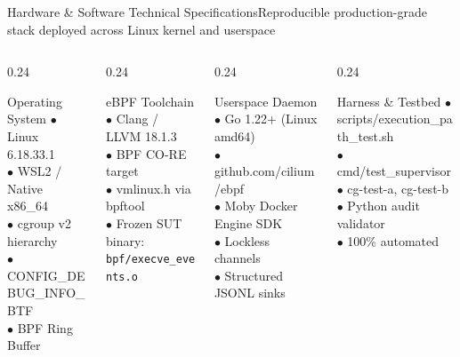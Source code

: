 \documentclass[aspectratio=169,10pt]{beamer}
\begin{document}
\begin{frame}{Hardware \& Software Technical Specifications}{Reproducible production-grade stack deployed across Linux kernel and userspace}
  \begin{columns}[T]
    \begin{column}{0.24\textwidth}
      \begin{block}{Operating System}
        \tiny
        $\bullet$ Linux 6.18.33.1\\
        $\bullet$ WSL2 / Native x86\_64\\
        $\bullet$ cgroup v2 hierarchy\\
        $\bullet$ CONFIG\_DEBUG\_INFO\_BTF\\
        $\bullet$ BPF Ring Buffer
      \end{block}
    \end{column}

    \begin{column}{0.24\textwidth}
      \begin{block}{eBPF Toolchain}
        \tiny
        $\bullet$ Clang / LLVM 18.1.3\\
        $\bullet$ BPF CO-RE target\\
        $\bullet$ vmlinux.h via bpftool\\
        $\bullet$ Frozen SUT binary:\\
        \texttt{bpf/execve\_events.o}
      \end{block}
    \end{column}

    \begin{column}{0.24\textwidth}
      \begin{block}{Userspace Daemon}
        \tiny
        $\bullet$ Go 1.22+ (Linux amd64)\\
        $\bullet$ github.com/cilium/ebpf\\
        $\bullet$ Moby Docker Engine SDK\\
        $\bullet$ Lockless channels\\
        $\bullet$ Structured JSONL sinks
      \end{block}
    \end{column}

    \begin{column}{0.24\textwidth}
      \begin{block}{Harness \& Testbed}
        \tiny
        $\bullet$ scripts/execution\_path\_test.sh\\
        $\bullet$ cmd/test\_supervisor\\
        $\bullet$ cg-test-a, cg-test-b\\
        $\bullet$ Python audit validator\\
        $\bullet$ 100\% automated
      \end{block}
    \end{column}
  \end{columns}
\end{frame}
\end{document}
